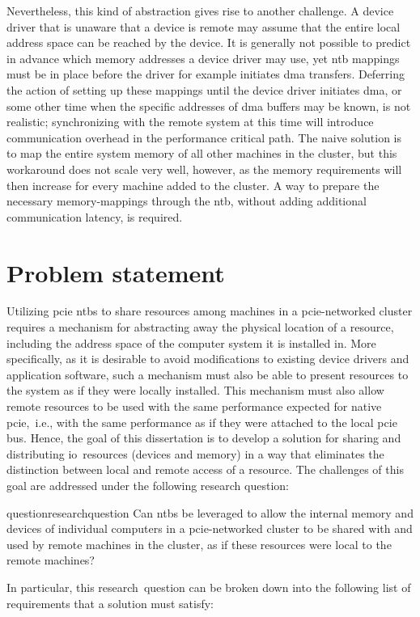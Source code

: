 Nevertheless, this kind of abstraction gives rise to another challenge. 
%
A device driver that is unaware that a device is remote may assume that the entire local address space can be reached by the device.
%
It is generally not possible to predict in advance which memory addresses a device driver may use, yet \gls{ntb} mappings must be in place before the driver for example initiates \gls{dma} transfers.
%
Deferring the action of setting up these mappings until the device driver initiates \gls{dma}, or some other time when the specific addresses of \gls{dma} buffers may be known, is not realistic;
%
synchronizing with the remote system at this time will introduce communication overhead in the performance critical path.
%
The naive solution is to map the entire system memory of all other machines in the cluster, but this workaround does not scale very well, however, as the memory requirements will then increase for every machine added to the cluster.
%
A way to prepare the necessary memory-mappings through the \gls{ntb}, without adding additional communication latency, is required.




\section{Problem statement}\label{sec:problem}
Utilizing \gls{pcie} \glspl{ntb} to share resources among machines in a \gls{pcie}-networked cluster requires a mechanism for abstracting away the physical location of a resource, including the address space of the computer system it is installed in. 
%
More specifically, as it is desirable to avoid modifications to existing device drivers and application software, such a mechanism must also be able to present resources to the system as if they were locally installed.
%
This mechanism must also allow remote resources to be used with the same performance expected for native \gls{pcie},~i.e., with the same performance as if they were attached to the local \gls{pcie} bus.
%
Hence, the goal of this dissertation is to develop a solution for sharing and distributing \gls{io}~resources (devices and memory) in a way that eliminates the distinction between local and remote access of a resource. 
%
The challenges of this goal are addressed under the following research question: 
\begin{restatable}{question}{researchquestion}\label{question}
    Can \glspl{ntb} be leveraged to allow the internal memory and devices of individual computers in a \gls{pcie}-networked cluster to be shared with and used by remote machines in the cluster, as if these resources were local to the remote machines?
\end{restatable}
%
In particular, this research~question can be broken down into the following list of requirements that a solution must satisfy:


